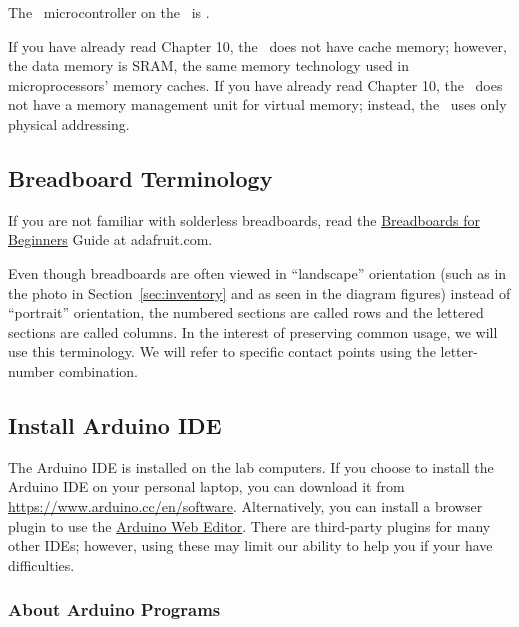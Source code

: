 The \microcontroller\ microcontroller on the \developmentboard\ is \microcontrollerprocessorandmemory.
\microcontrollerintegertiming
\microcontrollerdivisionandfloats

\memorymodeldescription
\pipelinedescription
If you have already read Chapter 10, the \microcontroller\ does not have cache memory;
however, the data memory is SRAM, the same memory technology used in microprocessors' memory caches.
If you have already read Chapter 10, the \microcontroller\ does not have a memory management unit for virtual memory;
instead, the \microcontroller\ uses only physical addressing.

\subsection{Breadboard Terminology}

If you are not familiar with solderless breadboards, read the
\href{https://learn.adafruit.com/breadboards-for-beginners?view=all}{Breadboards for Beginners} Guide at adafruit.com.

Even though breadboards are often viewed in ``landscape'' orientation (such as in the photo in Section~\ref{sec:inventory} and as seen in the diagram figures) instead of ``portrait'' orientation, the numbered sections are called rows and the lettered sections are called columns.
In the interest of preserving common usage, we will use this terminology.
We will refer to specific contact points using the letter-number combination.



\subsection{Install Arduino IDE}

The Arduino IDE is installed on the lab computers.
If you choose to install the Arduino IDE on your personal laptop, you can download it from
\url{https://www.arduino.cc/en/software}.
Alternatively, you can install a browser plugin to use the
\href{https://create.arduino.cc/projecthub/Arduino_Genuino/getting-started-with-arduino-web-editor-on-various-platforms-4b3e4a}{Arduino Web Editor}.
There are third-party plugins for many other IDEs; however, using these may limit our ability to help you if your have difficulties.

\subsubsection*{About Arduino Programs}

